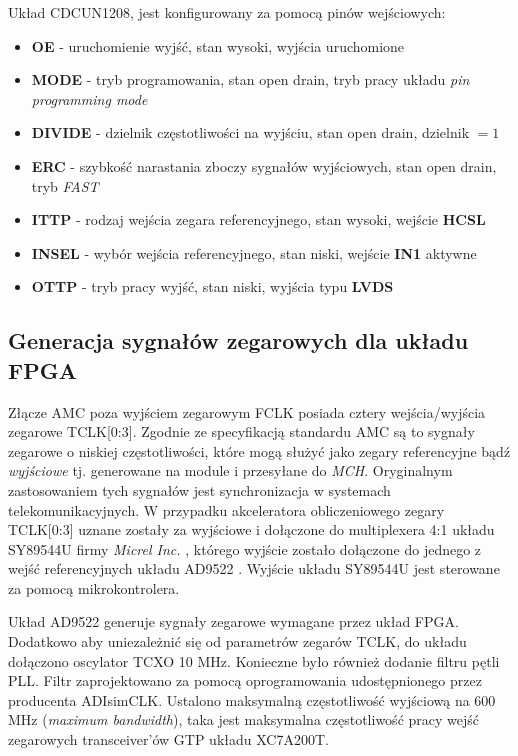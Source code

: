 Układ CDCUN1208, jest konfigurowany za pomocą pinów wejściowych:
\begin{itemize}
\item
\textbf{OE} - uruchomienie wyjść, stan wysoki, wyjścia uruchomione
\item
\textbf{MODE} - tryb programowania, stan open drain, tryb pracy układu \textit{pin programming mode}
\item
\textbf{DIVIDE} - dzielnik częstotliwości na wyjściu, stan open drain, dzielnik $= 1$
\item
\textbf{ERC} - szybkość narastania zboczy sygnałów wyjściowych, stan open drain, tryb \textit{FAST}
\item
\textbf{ITTP} - rodzaj wejścia zegara referencyjnego, stan wysoki, wejście \textbf{HCSL}
\item
\textbf{INSEL} - wybór wejścia referencyjnego, stan niski, wejście \textbf{IN1} aktywne
\item
\textbf{OTTP} - tryb pracy wyjść, stan niski, wyjścia typu \textbf{LVDS}
\end{itemize}

\subsection{Generacja sygnałów zegarowych dla układu FPGA}
Złącze AMC poza wyjściem zegarowym FCLK posiada cztery wejścia/wyjścia zegarowe TCLK[0:3]. Zgodnie ze specyfikacją standardu AMC \cite{AMC_BASE} są to sygnały zegarowe o niskiej częstotliwości, które mogą służyć jako zegary referencyjne bądź \textit{wyjściowe} tj. generowane na module i przesyłane do \textit{MCH}. Oryginalnym zastosowaniem tych sygnałów jest synchronizacja w systemach telekomunikacyjnych. W przypadku akceleratora obliczeniowego zegary TCLK[0:3] uznane zostały za wyjściowe i dołączone do multiplexera 4:1 układu SY89544U \cite{DATASHEET:SY89544U} firmy \textit{Micrel Inc.} \cite{COMPANY:MICREL}, którego wyjście zostało dołączone do jednego z wejść referencyjnych układu AD9522 \cite{AD9522}. Wyjście układu SY89544U jest sterowane za pomocą mikrokontrolera.
 
 Układ AD9522 generuje sygnały zegarowe wymagane przez układ FPGA. Dodatkowo aby uniezależnić się od parametrów zegarów TCLK, do układu dołączono oscylator TCXO 10 MHz. Konieczne było również dodanie filtru pętli PLL. Filtr zaprojektowano za pomocą oprogramowania udostępnionego przez producenta ADIsimCLK. Ustalono maksymalną częstotliwość wyjściową na 600 MHz (\textit{maximum bandwidth}), taka jest maksymalna częstotliwość pracy wejść zegarowych transceiver'ów GTP układu XC7A200T.  
 

